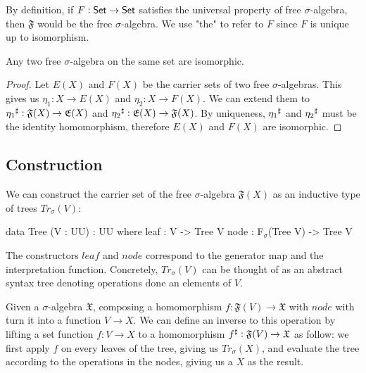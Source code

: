By definition, if $F : \mathsf{Set} \to \mathsf{Set}$ satisfies the universal property of
free $\sigma$-algebra, then $\mathfrak{F}$ would be the free $\sigma$-algebra.
We use "the" to refer to $F$ since $F$ is unique up to isomorphism. 

\begin{lemma}\label{lem:free-algebras-unique}
Any two free $\sigma$-algebra on the same set are isomorphic.
\end{lemma}
\begin{proof}
Let $E(X)$ and $F(X)$ be the carrier sets of two free $\sigma$-algebras.
This gives us $\eta_1 : X \to E(X)$ and $\eta_2 : X \to F(X)$.
We can extend them to ${\eta_1}^{\sharp} : \mathfrak{F}(X) \to \mathfrak{E}(X)$
and  ${\eta_2}^{\sharp} : \mathfrak{E}(X) \to \mathfrak{F}(X)$. By uniqueness,
${\eta_1}^{\sharp}$ and ${\eta_2}^{\sharp}$ must be the identity homomorphism,
therefore $E(X)$ and $F(X)$ are isomorphic.
\end{proof}

\subsection{Construction}
We can construct the carrier set of the free $\sigma$-algebra
$\mathfrak{F}(X)$ as an inductive type of trees $Tr_\sigma(V)$:
\begin{code}
data Tree (V : UU) : UU where
    leaf : V -> Tree V
    node : F$_\sigma$(Tree V) -> Tree V
\end{code}

The constructors $leaf$ and $node$ correspond to the generator map
and the interpretation function. Concretely, $Tr_\sigma(V)$ can
be thought of as an abstract syntax tree denoting operations done
an elements of $V$. 

Given a $\sigma$-algebra $\mathfrak{X}$, composing a homomorphism
$f : \mathfrak{F}(V) \to \mathfrak{X}$ with $node$ with turn it
into a function $V \to X$.
We can define an inverse to this operation by lifting a set function
$f : V \to X$ to a homomorphism ${f}^{\sharp} : \mathfrak{F}(V) \to \mathfrak{X}$
as follow: we first apply $f$ on every leaves of the tree, giving us
$Tr_\sigma(X)$, and evaluate the tree according to the operations
in the nodes, giving us a $X$ as the result.

